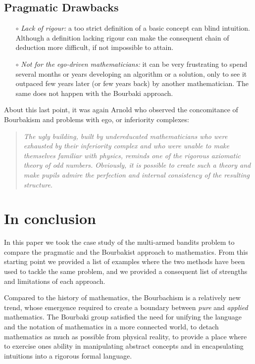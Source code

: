\documentclass[]{scrartcl}
\theoremstyle{definition}
\begin{document}
\subsection*{Pragmatic Drawbacks}



\begin{itemize}
    \item[$\circ$] \emph{Lack of rigour:} a too strict definition of a basic concept can blind intuition. Although a definition lacking rigour can make the consequent chain of deduction more difficult, if not impossible to attain.
    
    \item[$\circ$] \emph{Not for the ego-driven mathematicians:} it can be very frustrating to spend several months or years developing an algorithm or a solution, only to see it outpaced few years later (or few years back) by another mathematician. 
    The same does not happen with the Bourbaki approach.

\end{itemize}

About this last point, it was again Arnold who observed the concomitance of Bourbakism and problems with ego, or inferiority complexes:

\begin{quotation}
    \emph{The ugly building, built by undereducated mathematicians who were exhausted by their inferiority complex and who were unable to make themselves familiar with physics, reminds one of the rigorous axiomatic theory of odd numbers. Obviously, it is possible to create such a theory and make pupils admire the perfection and internal consistency of the resulting structure.}~\cite{arnol1998teaching}
\end{quotation}


\section{In conclusion}

In this paper we took the case study of the multi-armed bandits problem to compare the pragmatic and the Bourbakist approach to mathematics. From this starting point we provided a list of examples where the two methods have been used to tackle the same problem, and we provided a consequent list of strengths and limitations of each approach. 

Compared to the history of mathematics, the Bourbachism is a relatively new trend, whose emergence required to create a boundary between \emph{pure} and \emph{applied} mathematics. The Bourbaki group satisfied the need for unifying the language and the notation of mathematics in a more connected world, to detach mathematics as much as possible from physical reality, to provide a place where to exercise ones ability in manipulating abstract concepts and in encapsulating intuitions into a rigorous formal language.
\end{document}
